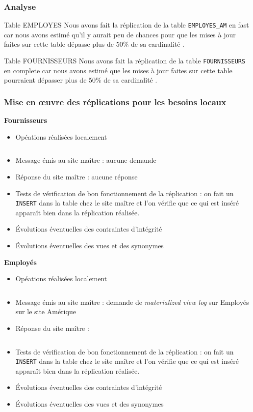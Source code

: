 \documentclass[10pt,a4paper]{article}
\theoremstyle{plain}
\begin{document}
\subsubsection{Analyse}
Table EMPLOYES
Nous avons fait la réplication de la table \verb|EMPLOYES_AM| en fast  car nous avons estimé qu’il y aurait peu de chances pour que les mises à jour faites sur cette table dépasse plus de 50\% de sa cardinalité .

Table FOURNISSEURS
Nous avons fait la réplication de la table \verb|FOURNISSEURS| en complete car nous avons estimé que les mises à jour faites sur cette table pourraient dépasser plus de 50\% de sa cardinalité .


\subsubsection{Mise en \oe uvre des réplications pour les besoins locaux}
\textbf{Fournisseurs}
\begin{itemize}
    \item Opéations réalisées localement
    \inputminted{sql}{EUS_V-A-5-a1.sql}
    \item Message émis au site maître : aucune demande
    \item Réponse du site maître : aucune réponse
    \item Tests de vérification de bon fonctionnement de la réplication : on fait un \verb|INSERT| dans la table chez le site maître et l'on vérifie que ce qui est inséré apparaît bien dans la réplication réalisée.
    \item Évolutions éventuelles des contraintes d'intégrité
    \item Évolutions éventuelles des vues et des synonymes
\end{itemize}

\textbf{Employés}
\begin{itemize}
    \item Opéations réalisées localement
    \inputminted{sql}{EUS_V-A-5-b1.sql}
    \item Message émis au site maître : demande de \emph{materialized view log} sur Employés sur le site Amérique
    \item Réponse du site maître : \inputminted{sql}{EUS_V-A-5-b3.sql}
    \item Tests de vérification de bon fonctionnement de la réplication : on fait un \verb|INSERT| dans la table chez le site maître et l'on vérifie que ce qui est inséré apparaît bien dans la réplication réalisée.
    \item Évolutions éventuelles des contraintes d'intégrité
    \item Évolutions éventuelles des vues et des synonymes
\end{itemize}
\end{document}
